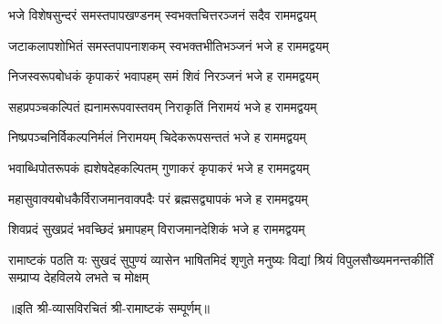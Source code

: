 
\twolineshloka
{भजे विशेषसुन्दरं समस्तपापखण्डनम्}
{स्वभक्तचित्तरञ्जनं सदैव राममद्वयम्}

\twolineshloka
{जटाकलापशोभितं समस्तपापनाशकम्}
{स्वभक्तभीतिभञ्जनं भजे ह राममद्वयम्}

\twolineshloka
{निजस्वरूपबोधकं कृपाकरं भवापहम्}
{समं शिवं निरञ्जनं भजे ह राममद्वयम्}

\twolineshloka
{सहप्रपञ्चकल्पितं ह्यनामरूपवास्तवम्}
{निराकृतिं निरामयं भजे ह राममद्वयम्}

\twolineshloka
{निष्प्रपञ्चनिर्विकल्पनिर्मलं निरामयम्}
{चिदेकरूपसन्ततं भजे ह राममद्वयम्}

\twolineshloka
{भवाब्धिपोतरूपकं ह्यशेषदेहकल्पितम्}
{गुणाकरं कृपाकरं भजे ह राममद्वयम्}

\twolineshloka
{महासुवाक्यबोधकैर्विराजमानवाक्पदैः}
{परं ब्रह्मसद्व्यापकं भजे ह राममद्वयम्}

\twolineshloka
{शिवप्रदं सुखप्रदं भवच्छिदं भ्रमापहम्}
{विराजमानदेशिकं भजे ह राममद्वयम्}

\fourlineindentedshloka
{रामाष्टकं पठति यः सुखदं सुपुण्यं}
{व्यासेन भाषितमिदं शृणुते मनुष्यः}
{विद्यां श्रियं विपुलसौख्यमनन्तकीर्तिं}
{सम्प्राप्य देहविलये लभते च मोक्षम्}

॥इति श्री-व्यासविरचितं श्री-रामाष्टकं सम्पूर्णम्॥